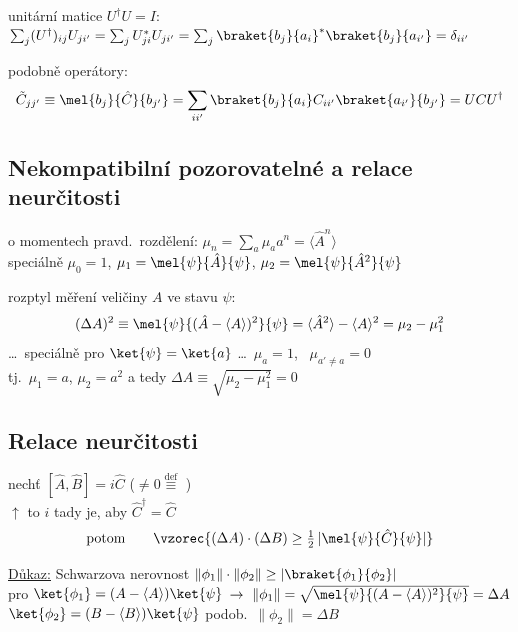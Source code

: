 \documentclass[11pt,a4paper]{article}
\begin{document}
unitární matice \quad $U^\dagger U = I$: \quad
$\sum_j (U^\dagger)_{ij}U_{ji'} = \sum_j U_{ji}^*U_{ji'} = \sum_j\braket{b_j}{a_i}^*\braket{b_j}{a_{i'}} = \delta_{ii'}$

podobně operátory:
\[
  \tilde C_{jj'} \equiv \mel{b_j}{\hat C}{b_{j'}} = \sum_{ii'}\braket{b_j}{a_i}C_{ii'}\braket{a_{i'}}{b_{j'}} = UCU^\dagger
\]

\subsection*{Nekompatibilní pozorovatelné a relace neurčitosti}
o momentech pravd.\ rozdělení: \quad $\mu_n = \sum_a \mu_a a^n = \langle\hat A^n\rangle$ \\
speciálně \quad $\mu_0 = 1$, \quad $\mu_1 = \mel{\psi}{\hat A}{\psi}$, \quad $\mu_2 = \mel{\psi}{\hat A^2}{\psi}$

rozptyl měření veličiny $A$ ve stavu $\psi$:
\[
  (\Delta A)^2 \equiv \mel{\psi}{(\hat A - \langle A\rangle)^2}{\psi} = \langle\hat A^2\rangle - \langle A\rangle^2 = \mu_2 - \mu_1^2
\]
\dots\ speciálně pro $\ket{\psi} = \ket{a}$ \quad \dots\ $\mu_a = 1$, \ $\mu_{a'\neq a} = 0$ \\
\quad tj.\ $\mu_1 = a$, $\mu_2 = a^2$ \quad a tedy \quad $\Delta A \equiv \sqrt{\mu_2 - \mu_1^2} = 0$

\subsection*{Relace neurčitosti}
\begin{veta}
nechť \quad $[\hat A,\hat B] = i\hat C$ \quad ($\neq 0 \overset{\text{def}}{\equiv}$ ) \\
\quad \phantom{nechť} $\uparrow$ to $i$ tady je, aby $\hat C^\dagger = \hat C$
\[
  \text{potom}\qquad \vzorec{(\Delta A)\cdot(\Delta B) \geq \tfrac12\,|\mel{\psi}{\hat C}{\psi}|}
\]
\end{veta}

\underline{Důkaz:} \quad Schwarzova nerovnost \quad $\|\phi_1\|\cdot\|\phi_2\| \geq |\braket{\phi_1}{\phi_2}|$ \\
\quad pro \quad $\ket{\phi_1} = (A - \langle A\rangle)\ket{\psi}$ \quad $\to\ \|\phi_1\| = \sqrt{\mel{\psi}{(A-\langle A\rangle)^2}{\psi}} = \Delta A$ \\
\quad \phantom{pro} \quad $\ket{\phi_2} = (B - \langle B\rangle)\ket{\psi}$ \quad podob.\ $\|\phi_2\| = \Delta B$
\end{document}
